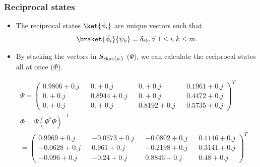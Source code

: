 \documentclass{beamer}
\begin{document}
\begin{frame}
    \frametitle{Reciprocal states}
    \begin{itemize}
        \item The reciprocal states $\ket{\tilde{\phi_{i}}}$ are unique
              vectors such that
              \begin{align}
                  \braket{ \tilde{\phi_{i}} }{\psi_{k}} = \delta_{ik}, \forall \; 1 \leq i, k \leq m.
              \end{align}
        \item By stacking the vectors in $S_{\ket{\psi}}$ ($\Psi$), we can
              calculate the reciprocal states all at once ($\Phi$).
    \end{itemize}
    {
    \scriptsize
    \begin{align*}
         & \Psi                           = \begin{pmatrix}
                                                0.9806+0.j &  & 0.    +0.j &  & 0.    +0.j &  & 0.1961+0.j \\
                                                0.    +0.j &  & 0.8944+0.j &  & 0.    +0.j &  & 0.4472+0.j \\
                                                0.    +0.j &  & 0.    +0.j &  & 0.8192+0.j &  & 0.5735+0.j
                                            \end{pmatrix}^{T} \\
         & \Phi = \Psi(\Psi^{*}\Psi)^{-1}                                                              \\
         & = \begin{pmatrix}
                 0.9969+0.j  &  & -0.0573+0.j &  & -0.0802+0.j &  & 0.1146+0.j \\
                 -0.0628+0.j &  & 0.961 +0.j  &  & -0.2198+0.j &  & 0.3141+0.j \\
                 -0.096 +0.j &  & -0.24  +0.j &  & 0.8846+0.j  &  & 0.48  +0.j
             \end{pmatrix}^{T}
    \end{align*}
    }
\end{frame}
\end{document}
